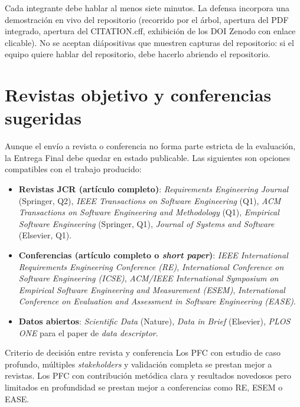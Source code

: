 \documentclass[11pt,a4paper]{article}
\begin{document}
Cada integrante debe hablar al menos siete minutos. La defensa incorpora una demostraci\'on en vivo del repositorio (recorrido por el \'arbol, apertura del PDF integrado, apertura del CITATION.cff, exhibici\'on de los DOI Zenodo con enlace clicable). No se aceptan di\'apositivas que muestren capturas del repositorio: si el equipo quiere hablar del repositorio, debe hacerlo abriendo el repositorio.

\section{Revistas objetivo y conferencias sugeridas}

Aunque el env\'io a revista o conferencia no forma parte estricta de la evaluaci\'on, la Entrega Final debe quedar en estado publicable. Las siguientes son opciones compatibles con el trabajo producido:

\begin{itemize}
    \item \textbf{Revistas JCR (art\'iculo completo)}: \emph{Requirements Engineering Journal} (Springer, Q2), \emph{IEEE Transactions on Software Engineering} (Q1), \emph{ACM Transactions on Software Engineering and Methodology} (Q1), \emph{Empirical Software Engineering} (Springer, Q1), \emph{Journal of Systems and Software} (Elsevier, Q1).
    \item \textbf{Conferencias (art\'iculo completo o \emph{short paper})}: \emph{IEEE International Requirements Engineering Conference (RE)}, \emph{International Conference on Software Engineering (ICSE)}, \emph{ACM/IEEE International Symposium on Empirical Software Engineering and Measurement (ESEM)}, \emph{International Conference on Evaluation and Assessment in Software Engineering (EASE)}.
    \item \textbf{Datos abiertos}: \emph{Scientific Data} (Nature), \emph{Data in Brief} (Elsevier), \emph{PLOS ONE} para el paper de \emph{data descriptor}.
\end{itemize}

\begin{cajaconcepto}{Criterio de decisi\'on entre revista y conferencia}
Los PFC con estudio de caso profundo, m\'ultiples \emph{stakeholders} y validaci\'on completa se prestan mejor a revistas. Los PFC con contribuci\'on met\'odica clara y resultados novedosos pero limitados en profundidad se prestan mejor a conferencias como RE, ESEM o EASE.
\end{cajaconcepto}
\end{document}
